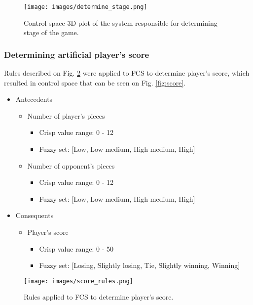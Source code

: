 \documentclass{article}
\begin{document}
\begin{figure}[tbhp]
  \centering
      \texttt{[image: images/determine\_stage.png]}
  \caption{Control space 3D plot of the system responsible for determining stage of the game.}
  \label{fig:stage}
\end{figure}

\subsubsection{Determining artificial player's score}

Rules described on Fig. \ref{fig:score_rules} were applied to FCS to determine player's score, which resulted in control space that can be seen on Fig. \ref{fig:score}.

\begin{itemize} 
\item Antecedents
     \begin{itemize} 
        \item Number of player's pieces
            \begin{itemize}
                \item Crisp value range: 0 - 12
                \item Fuzzy set: [Low, Low medium, High medium, High]
            \end{itemize}
        \item Number of opponent's pieces
            \begin{itemize}
                \item Crisp value range: 0 - 12
                \item Fuzzy set: [Low, Low medium, High medium, High]
            \end{itemize}
     \end{itemize}
\item Consequents
     \begin{itemize} 
        \item Player's score
            \begin{itemize}
                \item Crisp value range: 0 - 50
                \item Fuzzy set: [Losing, Slightly losing, Tie, Slightly winning, Winning]
            \end{itemize}
     \end{itemize}
\end{itemize}

\begin{figure}[tbhp]
  \centering
      \texttt{[image: images/score\_rules.png]}
  \caption{Rules applied to FCS to determine player's score.}
  \label{fig:score_rules}
\end{figure}
\end{document}
